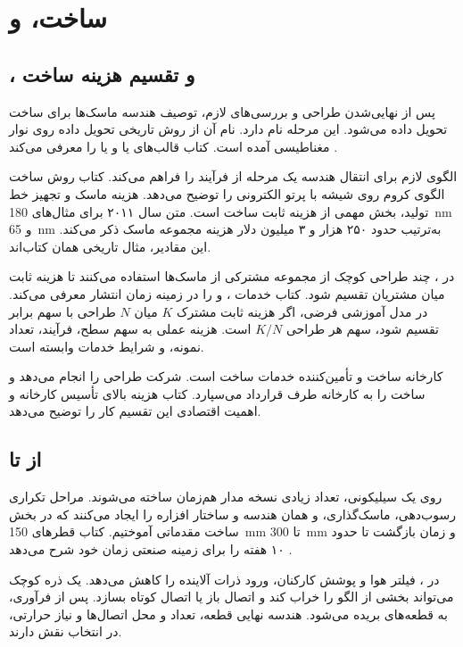 \section{ساخت،  و }
\label{sec:book-manufacturing}
\subsection{،  و تقسیم هزینه ساخت}
پس از نهایی‌شدن طراحی و بررسی‌های لازم، توصیف هندسه ماسک‌ها برای ساخت تحویل
داده می‌شود. این مرحله  نام دارد. نام آن از روش تاریخی تحویل داده روی
نوار مغناطیسی آمده است. کتاب قالب‌های  یا
 و  یا  را معرفی می‌کند
\cite[بخش ]{weste}.

 الگوی لازم برای انتقال هندسه یک مرحله از فرآیند را فراهم می‌کند.
کتاب روش ساخت الگوی کروم روی شیشه با پرتو الکترونی را توضیح می‌دهد.
هزینه ماسک و تجهیز خط تولید، بخش مهمی از هزینه ثابت ساخت است.
متن سال ۲۰۱۱ برای مثال‌های \qty{180}{\nano\metre} و \qty{65}{\nano\metre}
به‌ترتیب حدود ۲۵۰ هزار و ۳ میلیون دلار هزینه مجموعه ماسک ذکر می‌کند.
این مقادیر، مثال تاریخی همان کتاب‌اند.

در ، چند طراحی کوچک از مجموعه مشترکی از ماسک‌ها استفاده
می‌کنند تا هزینه ثابت میان مشتریان تقسیم شود. کتاب خدمات ،
 و  را در زمینه زمان انتشار معرفی می‌کند.
در مدل آموزشی فرضی، اگر هزینه ثابت مشترک \(K\) میان \(N\) طراحی با سهم برابر
تقسیم شود، سهم هر طراحی \(K/N\) است. هزینه عملی به سهم سطح، فرآیند، تعداد نمونه،
 و شرایط خدمات وابسته است.

 کارخانه ساخت و  تأمین‌کننده خدمات ساخت است.
شرکت  طراحی را انجام می‌دهد و ساخت را به کارخانه طرف قرارداد می‌سپارد.
کتاب هزینه بالای تأسیس کارخانه و اهمیت اقتصادی این تقسیم کار را توضیح می‌دهد.

\subsection{از  تا }
روی یک  سیلیکونی، تعداد زیادی نسخه مدار هم‌زمان ساخته می‌شوند.
مراحل تکراری رسوب‌دهی، ماسک‌گذاری،  و  همان هندسه و
ساختار افزاره را ایجاد می‌کنند که در بخش ساخت مقدماتی آموختیم.
کتاب قطرهای \qty{150}{\milli\metre} تا \qty{300}{\milli\metre} و زمان بازگشت
تا حدود ۱۰ هفته را برای زمینه صنعتی زمان خود شرح می‌دهد \cite[صفحه ۵۴]{weste}.

در ، فیلتر هوا و پوشش کارکنان، ورود ذرات آلاینده را کاهش می‌دهد.
یک ذره کوچک می‌تواند بخشی از الگو را خراب کند و اتصال باز یا اتصال کوتاه بسازد.
پس از فرآوری،  به قطعه‌های  بریده می‌شود. هندسه نهایی قطعه،
تعداد و محل اتصال‌ها و نیاز حرارتی، در انتخاب  نقش دارند.

